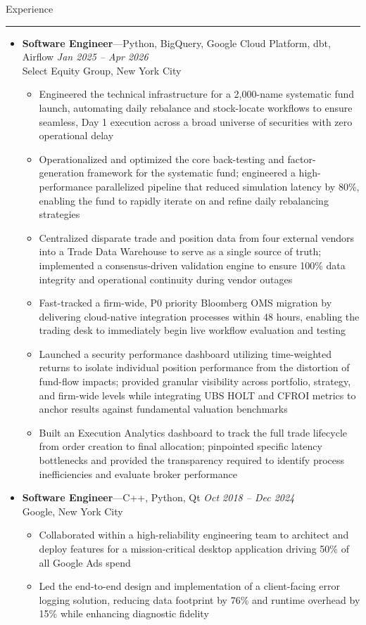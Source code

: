 \documentclass[10pt,oneside]{article}
\newcommand{\sectitle}[1]{
  \begin{flushleft}{\selectfont\Large#1}\end{flushleft}
}
\newenvironment{ressection}[1]{
  \vspace{0pt}
  \sectitle{#1}
  \vspace{-10pt}\rule{\textwidth}{0.5pt}
  \vspace{-10pt}
  \begin{itemize}[leftmargin=0pt, rightmargin=-5pt, label={}]
  \vspace{-2pt}
  }{
  \end{itemize}
}
\newcommand{\ressubitem}[1]{
  \vspace{-1pt}
  \item[$\bullet$] \begin{flushleft} #1 \end{flushleft}
}
\newcommand{\resbigitemline}[4]{
  \vspace{-1pt}
  \item
  \textbf{#1}---#4
  \hfill
  \textit{#3} \\
  #2

}
\newenvironment{ressubsecline}[4]{
  \resbigitemline{#1}{#2}{#3}{#4}
  \vspace{-2pt}
  \begin{itemize}[rightmargin=5pt]
}{
  \end{itemize}
  \vspace{-2pt}
}
\begin{document}
\begin{ressection}{Experience}
	\begin{ressubsecline}{Software Engineer}{Select Equity Group, New York City}{Jan 2025 -- Apr 2026}{Python, BigQuery, Google Cloud Platform, dbt, Airflow}
    \ressubitem{Engineered the technical infrastructure for a 2,000-name systematic fund launch, automating daily rebalance and stock-locate workflows to ensure seamless, Day 1 execution across a broad universe of securities with zero operational delay}
    \ressubitem{Operationalized and optimized the core back-testing and factor-generation framework for the systematic fund; engineered a high-performance parallelized pipeline that reduced simulation latency by 80\%, enabling the fund to rapidly iterate on and refine daily rebalancing strategies}
    \ressubitem{Centralized disparate trade and position data from four external vendors into a Trade Data Warehouse to serve as a single source of truth; implemented a consensus-driven validation engine to ensure 100\% data integrity and operational continuity during vendor outages}
    \ressubitem{Fast-tracked a firm-wide, P0 priority Bloomberg OMS migration by delivering cloud-native integration processes within 48 hours, enabling the trading desk to immediately begin live workflow evaluation and testing}
    \ressubitem{Launched a security performance dashboard utilizing time-weighted returns to isolate individual position performance from the distortion of fund-flow impacts; provided granular visibility across portfolio, strategy, and firm-wide levels while integrating UBS HOLT and CFROI metrics to anchor results against fundamental valuation benchmarks}
    \ressubitem{Built an Execution Analytics dashboard to track the full trade lifecycle from order creation to final allocation; pinpointed specific latency bottlenecks and provided the transparency required to identify process inefficiencies and evaluate broker performance}
	\end{ressubsecline}
  \begin{ressubsecline}{Software Engineer}{Google, New York City}{Oct 2018 -- Dec 2024}{C++, Python, Qt}
    \ressubitem{Collaborated within a high-reliability engineering team to architect and deploy features for a mission-critical desktop application driving 50\% of all Google Ads spend}
    \ressubitem{Led the end-to-end design and implementation of a client-facing error logging solution, reducing data footprint by 76\% and runtime overhead by 15\% while enhancing diagnostic fidelity}

\end{ressubsecline}
\end{ressection}
\end{document}

